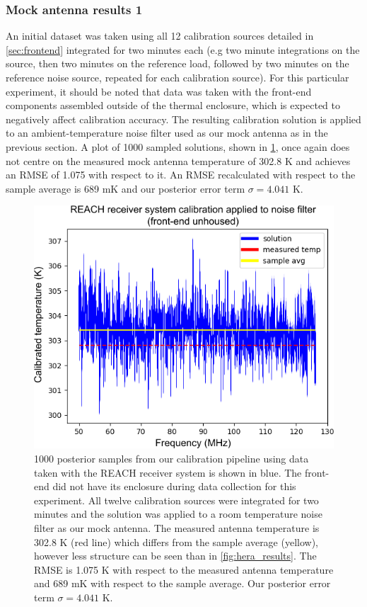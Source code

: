 \subsubsection{Mock antenna results 1}
An initial dataset was taken using all 12 calibration sources detailed in \cref{sec:frontend} integrated for two minutes each (e.g two minute integrations on the source, then two minutes on the reference load, followed by two minutes on the reference noise source, repeated for each calibration source). For this particular experiment, it should be noted that data was taken with the front-end components assembled outside of the thermal enclosure, which is expected to negatively affect calibration accuracy. The resulting calibration solution is applied to an ambient-temperature noise filter used as our mock antenna as in the previous section. A plot of 1000 sampled solutions, shown in \cref{fig:reach_results_1}, once again does not centre on the measured mock antenna temperature of 302.8 K and achieves an RMSE of 1.075 with respect to it. An RMSE recalculated with respect to the sample average is 689 mK and our posterior error term $\sigma=4.041$ K.
\begin{figure}
    \centering
    \includegraphics[width=.8\textwidth]{reach_results_1}
    \caption{1000 posterior samples from our calibration pipeline using data taken with the REACH receiver system is shown in blue. The front-end did not have its enclosure during data collection for this experiment. All twelve calibration sources were integrated for two minutes and the solution was applied to a room temperature noise filter as our mock antenna. The measured antenna temperature is 302.8 K (red line) which differs from the sample average (yellow), however less structure can be seen than in \cref{fig:hera_results}. The RMSE is 1.075 K with respect to the measured antenna temperature and 689 mK with respect to the sample average. Our posterior error term $\sigma=4.041$ K.}
    \label{fig:reach_results_1}
\end{figure}

